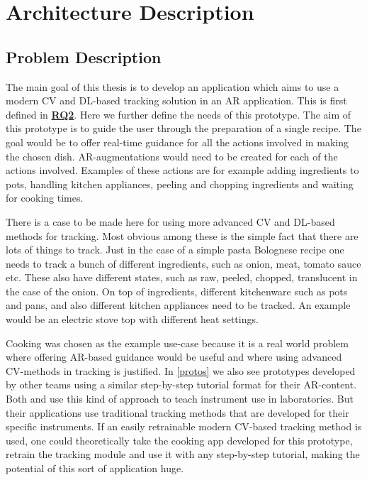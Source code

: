 \chapter{Architecture Description} \label{Arch description}

\section{Problem Description} \label{probDesc}

The main goal of this thesis is to develop an application which aims to use a 
modern CV and DL-based tracking solution in an AR application. This is first 
defined in \hyperref[rq2]{\textbf{RQ2}}. Here we further define the needs of 
this prototype. The aim of this prototype is to guide the user through the 
preparation of a single recipe. The goal would be to offer real-time guidance 
for all the actions involved in making the chosen dish. AR-augmentations 
would need to be created for each of the actions involved. Examples of these 
actions are for example adding ingredients to pots, handling kitchen 
appliances, peeling and chopping ingredients and waiting for cooking times. \par
	There is a case to be made here for using more advanced CV and 
DL-based methods for tracking. Most obvious among these is the simple fact 
that there are lots of things to track. Just in the case of a simple pasta 
Bolognese recipe one needs to track a bunch of different ingredients, such as 
onion, meat, tomato sauce etc. These also have different states, such as raw, 
peeled, chopped, translucent in the case of the onion. On top of ingredients, 
different kitchenware such as pots and pans, and also different kitchen 
appliances need to be tracked. An example would be an electric stove top with 
different heat settings. \par
	Cooking was chosen as the example use-case because it is a real world 
problem where offering AR-based guidance would be useful and where using 
advanced CV-methods in tracking is justified. In \ref{protos} we also see 
prototypes developed by other teams using a similar step-by-step tutorial 
format for their AR-content. Both \textcite{pylvanainen} and 
\textcite{reyesEtAl2016} use this kind of approach to teach instrument use in 
laboratories. But their applications use traditional tracking methods that 
are developed for their specific instruments. If an easily retrainable modern 
CV-based tracking method is used, one could theoretically take the cooking 
app developed for this prototype, retrain the tracking module and use it with 
any step-by-step tutorial, making the potential of this sort of application 
huge.

